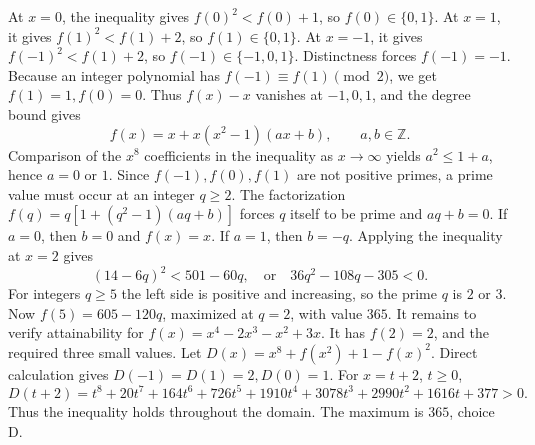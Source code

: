 At $x=0$, the inequality gives $f(0)^2<f(0)+1$, so $f(0)\in\{0,1\}$. At $x=1$, it gives $f(1)^2<f(1)+2$, so $f(1)\in\{0,1\}$. At $x=-1$, it gives $f(-1)^2<f(1)+2$, so $f(-1)\in\{-1,0,1\}$. Distinctness forces $f(-1)=-1$. Because an integer polynomial has $f(-1)\equiv f(1)\pmod2$, we get $f(1)=1,f(0)=0$.
Thus $f(x)-x$ vanishes at $-1,0,1$, and the degree bound gives
\[f(x)=x+x(x^2-1)(ax+b),\qquad a,b\in\mathbb Z.\]
Comparison of the $x^8$ coefficients in the inequality as $x\to\infty$ yields $a^2\le1+a$, hence $a=0$ or $1$.
Since $f(-1),f(0),f(1)$ are not positive primes, a prime value must occur at an integer $q\ge2$. The factorization $f(q)=q[1+(q^2-1)(aq+b)]$ forces $q$ itself to be prime and $aq+b=0$. If $a=0$, then $b=0$ and $f(x)=x$. If $a=1$, then $b=-q$. Applying the inequality at $x=2$ gives
\[(14-6q)^2<501-60q,\quad\text{or}\quad36q^2-108q-305<0.\]
For integers $q\ge5$ the left side is positive and increasing, so the prime $q$ is $2$ or $3$. Now $f(5)=605-120q$, maximized at $q=2$, with value $365$.
It remains to verify attainability for $f(x)=x^4-2x^3-x^2+3x$. It has $f(2)=2$, and the required three small values. Let $D(x)=x^8+f(x^2)+1-f(x)^2$. Direct calculation gives $D(-1)=D(1)=2,D(0)=1$. For $x=t+2$, $t\ge0$,
\[D(t+2)=t^8+20t^7+164t^6+726t^5+1910t^4+3078t^3+2990t^2+1616t+377>0.\]
Thus the inequality holds throughout the domain. The maximum is $\boxed{365}$, choice D.
